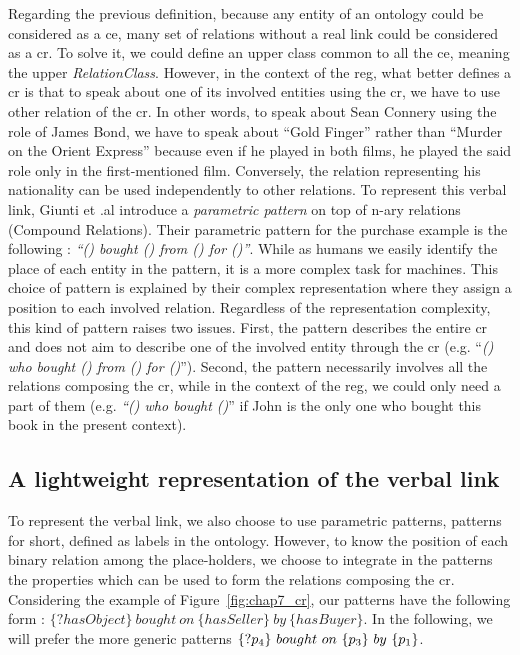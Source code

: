 Regarding the previous definition, because any entity of an ontology could be considered as a \acrshort{ce}, many set of relations without a real link could be considered as a \acrshort{cr}. To solve it, we could define an upper class common to all the \acrshort{ce}, meaning the upper \textit{RelationClass}. However, in the context of the \acrshort{reg}, what better defines a \acrshort{cr} is that to speak about one of its involved entities using the \acrshort{cr}, we have to use other relation of the \acrshort{cr}. In other words, to speak about Sean Connery using the role of James Bond, we have to speak about ``Gold Finger'' rather than ``Murder on the Orient Express'' because even if he played in both films, he played the said role only in the first-mentioned film. Conversely, the relation representing his nationality can be used independently to other relations. To represent this verbal link, Giunti et .al \cite{giunti_2019_representing} introduce a \textit{parametric pattern} on top of n-ary relations (Compound Relations). Their parametric pattern for the purchase example is the following : \textit{``() bought () from () for ()''}. While as humans we easily identify the place of each entity in the pattern, it is a more complex task for machines. This choice of pattern is explained by their complex representation where they assign a position to each involved relation. Regardless of the representation complexity, this kind of pattern raises two issues. First, the pattern describes the entire \acrshort{cr} and does not aim to describe one of the involved entity through the \acrshort{cr} (e.g. ``\textit{() who bought () from () for ()}''). Second, the pattern necessarily involves all the relations composing the \acrshort{cr}, while in the context of the \acrshort{reg}, we could only need a part of them (e.g. \textit{``() who bought ()}'' if John is the only one who bought this book in the present context).

\subsection{A lightweight representation of the verbal link}

To represent the verbal link, we also choose to use parametric patterns, patterns for short, defined as labels in the ontology. However, to know the position of each binary relation among the place-holders, we choose to integrate in the patterns the properties which can be used to form the relations composing the \acrshort{cr}. Considering the example of Figure~\ref{fig:chap7_cr}, our patterns have the following form : $\{?hasObject\}\ bought\ on\ \{hasSeller\}\ by\ \{hasBuyer\}$. In the following, we will prefer the more generic patterns $\{?\property_4\}\ bought\ on\ \{\property_3\}\ by\ \{\property_1\}$.

